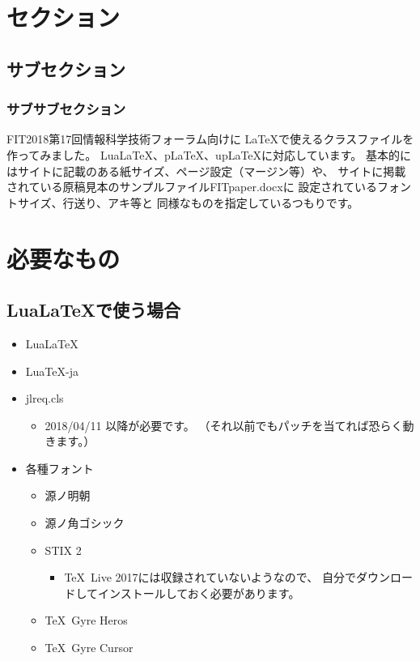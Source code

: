 \documentclass{FITpaper}
\begin{document}
\maketitle

\section{セクション}
\subsection{サブセクション}
\subsubsection{サブサブセクション}

FIT2018第17回情報科学技術フォーラム\cite{fit2018}向けに
\LaTeX で使えるクラスファイル\cite{fitpaper-class}を作ってみました。
Lua\LaTeX 、p\LaTeX 、up\LaTeX に対応しています。
基本的にはサイトに記載のある紙サイズ、ページ設定（マージン等）や、
サイトに掲載されている原稿見本のサンプルファイルFITpaper.docxに
設定されているフォントサイズ、行送り、アキ等と
同様なものを指定しているつもりです。

\section{必要なもの}

\subsection{Lua\LaTeX で使う場合}

\begin{itemize}
\item Lua\LaTeX
\item Lua\TeX -ja
\item jlreq.cls
  \begin{itemize}
  \item 2018/04/11 以降が必要です。
    （それ以前でもパッチ\cite{column_gap}を当てれば恐らく動きます。）
  \end{itemize}
\item 各種フォント
  \begin{itemize}
  \item 源ノ明朝
  \item 源ノ角ゴシック
  \item STIX 2
    \begin{itemize}
    \item \TeX~Live 2017には収録されていないようなので、
      自分でダウンロードしてインストールしておく必要があります。
    \end{itemize}
  \item \TeX~Gyre Heros
  \item \TeX~Gyre Cursor
  \end{itemize}
\end{itemize}
\end{document}
